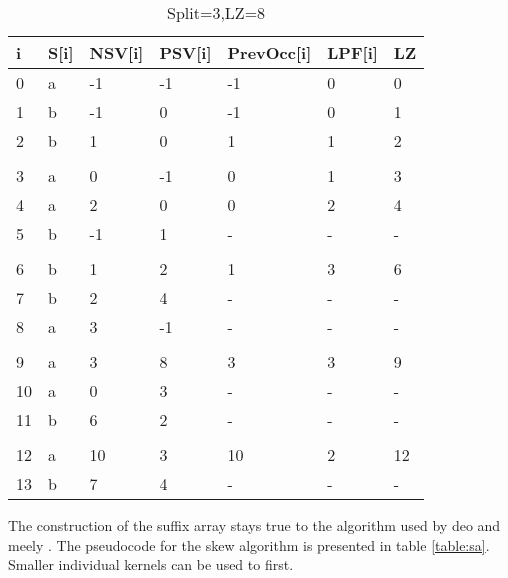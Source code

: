 \begin{table}[h]
\begin{tabular}{@{}lllllll@{}}
\toprule
i  & S{[}i{]} & NSV{[}i{]} & PSV{[}i{]} & PrevOcc{[}i{]} & LPF{[}i{]} & LZ \\ \midrule
0  & a        & -1         & -1         & -1             & 0          & 0  \\
1  & b        & -1         & 0          & -1             & 0          & 1  \\
2  & b        & 1          & 0          & 1              & 1          & 2  \\
   &          &            &            &                &            &    \\
3  & a        & 0          & -1         & 0              & 1          & 3  \\
4  & a        & 2          & 0          & 0              & 2          & 4  \\
5  & b        & -1         & 1          & -              & -          & -  \\
   &          &            &            &                &            &    \\
6  & b        & 1          & 2          & 1              & 3          & 6  \\
7  & b        & 2          & 4          & -              & -          & -  \\
8  & a        & 3          & -1         & -              & -          & -  \\
   &          &            &            &                &            &    \\
9  & a        & 3          & 8          & 3              & 3          & 9  \\
10 & a        & 0          & 3          & -              & -          & -  \\
11 & b        & 6          & 2          & -              & -          & -  \\
   &          &            &            &                &            &    \\
12 & a        & 10         & 3          & 10             & 2          & 12 \\
13 & b        & 7          & 4          & -              & -          & -  \\ \bottomrule
\end{tabular}
\caption{Split=3,LZ=8}
\label{table:example3}
\end{table}

The construction of the suffix array stays true to the algorithm used by deo and meely \cite{Deo}.
The pseudocode for the skew algorithm is presented in table \ref{table:sa}.
Smaller individual kernels can be used to first.

